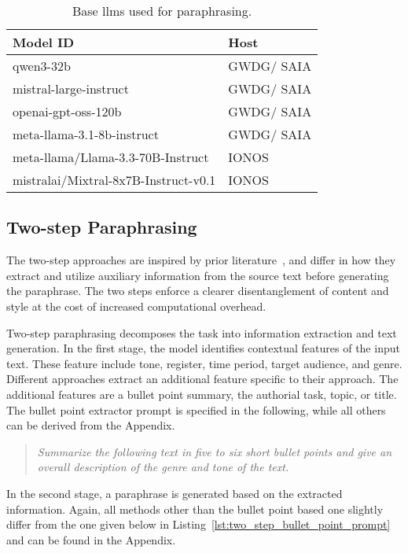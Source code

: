 \begin{table}[]
\centering
\caption{Base \acp{llm} used for paraphrasing.}
\label{tab:base_llms}
\begin{tabular}{ll}
\toprule
\textbf{Model ID}                    & \textbf{Host} \\
\midrule
qwen3-32b                            & GWDG/ SAIA    \\
mistral-large-instruct               & GWDG/ SAIA    \\
openai-gpt-oss-120b                  & GWDG/ SAIA    \\
meta-llama-3.1-8b-instruct           & GWDG/ SAIA    \\
meta-llama/Llama-3.3-70B-Instruct    & IONOS         \\
mistralai/Mixtral-8x7B-Instruct-v0.1 & IONOS     \\
\bottomrule   
\end{tabular}%
\end{table}


\subsection{Two-step Paraphrasing}

The two-step approaches are inspired by prior literature~\citep{bevendorff_overview_2024, ayele_overview_2024}, and differ in how they extract and utilize auxiliary information from the source text before generating the paraphrase. 
The two steps enforce a clearer disentanglement of content and style at the cost of increased computational overhead.

Two-step paraphrasing decomposes the task into information extraction and text generation. 
In the first stage, the model identifies contextual features of the input text.
These feature include tone, register, time period, target audience, and genre.
Different approaches extract an additional feature specific to their approach.
The additional features are a bullet point summary, the authorial task, topic, or title. 
The bullet point extractor prompt is specified in the following, while all others can be derived from the Appendix.

\begin{quote}
    \textit{Summarize the following text in five to six short bullet points and give an overall description
    of the genre and tone of the text.}
\end{quote}

In the second stage, a paraphrase is generated based on the extracted information. 
Again, all methods other than the bullet point based one slightly differ from the one given below in Listing~\ref{lst:two_step_bullet_point_prompt} and can be found in the Appendix.

